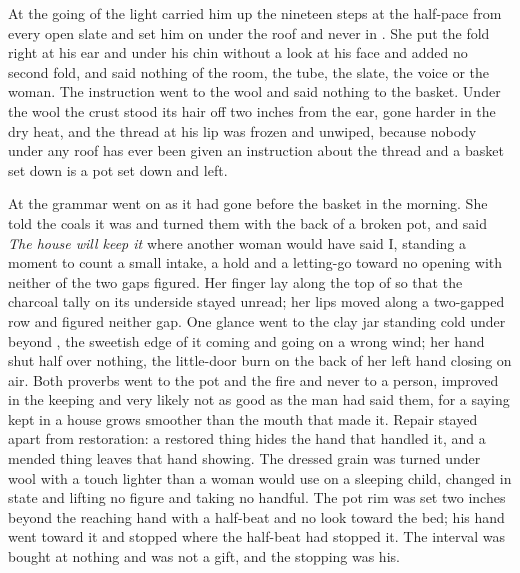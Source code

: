 \scenebreak

At the going of the light  carried him up the nineteen steps at the half-pace from every open slate and set him on  under the roof and never in . She put the fold right at his ear and under his chin without a look at his face and added no second fold, and said nothing of the room, the tube, the slate, the voice or the woman. The instruction went to the wool and said nothing to the basket. Under the wool the crust stood its hair off two inches from the ear, gone harder in the dry heat, and the thread at his lip was frozen and unwiped, because nobody under any roof has ever been given an instruction about the thread and a basket set down is a pot set down and left.

At  the grammar went on as it had gone before the basket in the morning. She told the coals it was  and turned them with the back of a broken pot, and said \emph{The house will keep it} where another woman would have said I, standing a moment to count a small intake, a hold and a letting-go toward no opening with neither of the two gaps figured. Her finger lay along the top of  so that the charcoal tally on its underside stayed unread; her lips moved along a two-gapped row and figured neither gap. One glance went to the clay jar standing cold under  beyond , the sweetish edge of it coming and going on a wrong wind; her hand shut half over nothing, the little-door burn on the back of her left hand closing on air. Both proverbs went to the pot and the fire and never to a person, improved in the keeping and very likely not as good as the man had said them, for a saying kept in a house grows smoother than the mouth that made it. Repair stayed apart from restoration: a restored thing hides the hand that handled it, and a mended thing leaves that hand showing. The dressed grain was turned under wool with a touch lighter than a woman would use on a sleeping child, changed in state and lifting no figure and taking no handful. The pot rim was set two inches beyond the reaching hand with a half-beat and no look toward the bed; his hand went toward it and stopped where the half-beat had stopped it. The interval was bought at nothing and was not a gift, and the stopping was his.

